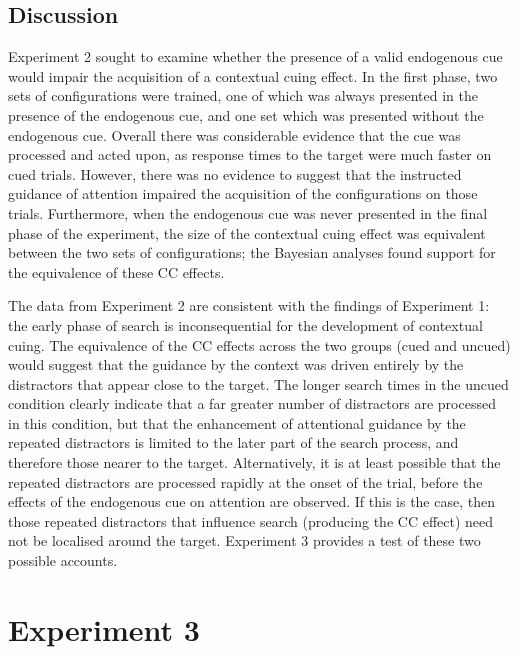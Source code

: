 \documentclass[
  man,
  floatsintext,
  longtable,
  nolmodern,
  notxfonts,
  notimes,
  colorlinks=true,linkcolor=blue,citecolor=blue,urlcolor=blue]{apa7}
\begin{document}
\subsection{Discussion}\label{discussion-1}

Experiment 2 sought to examine whether the presence of a valid
endogenous cue would impair the acquisition of a contextual cuing
effect. In the first phase, two sets of configurations were trained, one
of which was always presented in the presence of the endogenous cue, and
one set which was presented without the endogenous cue. Overall there
was considerable evidence that the cue was processed and acted upon, as
response times to the target were much faster on cued trials. However,
there was no evidence to suggest that the instructed guidance of
attention impaired the acquisition of the configurations on those
trials. Furthermore, when the endogenous cue was never presented in the
final phase of the experiment, the size of the contextual cuing effect
was equivalent between the two sets of configurations; the Bayesian
analyses found support for the equivalence of these CC effects.

The data from Experiment 2 are consistent with the findings of
Experiment 1: the early phase of search is inconsequential for the
development of contextual cuing. The equivalence of the CC effects
across the two groups (cued and uncued) would suggest that the guidance
by the context was driven entirely by the distractors that appear close
to the target. The longer search times in the uncued condition clearly
indicate that a far greater number of distractors are processed in this
condition, but that the enhancement of attentional guidance by the
repeated distractors is limited to the later part of the search process,
and therefore those nearer to the target. Alternatively, it is at least
possible that the repeated distractors are processed rapidly at the
onset of the trial, before the effects of the endogenous cue on
attention are observed. If this is the case, then those repeated
distractors that influence search (producing the CC effect) need not be
localised around the target. Experiment 3 provides a test of these two
possible accounts.

\section{Experiment 3}\label{experiment-3}
\end{document}
